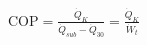 \( \text{COP} = \frac{\dot{Q}_{K}}{\dot{Q}_{sub} - \dot{Q}_{30}} = \frac{\dot{Q}_{K}}{\dot{W}_{t}} \)